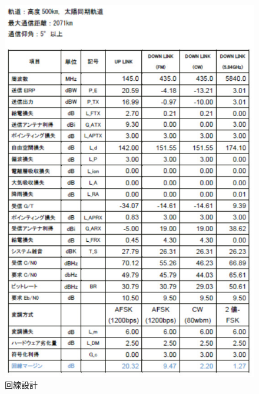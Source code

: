 \begin{figure}[H]
	\centering
	\includegraphics[scale=0.4]{03/fig/4-2-2.jpg}
	\caption{回線設計}
	\label{fig4-2-2}
\end{figure}

